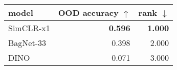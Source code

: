 \begin{tabular}{lrr}
\toprule
    model & OOD accuracy $\uparrow$ & rank $\downarrow$ \\
\midrule
SimCLR-x1 &          \textbf{0.596} &    \textbf{1.000} \\
BagNet-33 &                   0.398 &             2.000 \\
     DINO &                   0.071 &             3.000 \\
\bottomrule
\end{tabular}

